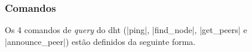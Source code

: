 
\subsubsection*{Comandos}

Os 4 comandos de \emph{query} do \gls*{dht} (\bverb|ping|, \bverb|find_node|,
\bverb|get_peers| e \bverb|announce_peer|) estão definidos da seguinte forma.





